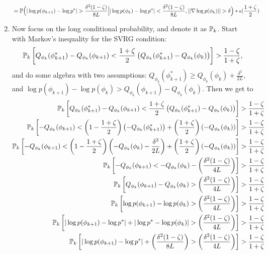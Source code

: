 \begin{enumerate}
\begin{align*}
        & = \mathbb{P}\Big(|\log p(\phi_{k+1}) - \log p^*| > \frac{\delta^2(1-\zeta)}{8L} \Big| |\log p(\phi_k) - \log p^*| < \frac{\delta^2(1-\zeta)}{8L}, ||\nabla \log p(\phi_k)|| > \delta \Big) * \epsilon(\frac{1+\zeta}{2})
    \end{align*}
    \item Now focus on the long conditional probability, and denote it as $\mathbb{P}_k$. Start with Markov's inequality for the SVRG condition:
    $$\mathbb{P}_k\left[Q_{\phi_k}(\phi^*_{k+1}) - Q_{\phi_k}(\phi_{k+1}) < \frac{1+\zeta}{2}\left(Q_{\phi_k}(\phi^*_{k+1}) - Q_{\phi_k}(\phi_{k})\right)\right] > \frac{1-\zeta}{1+\zeta},$$
    and do some algebra with two assumptions: $Q_{\phi_k}(\phi^*_{k+1}) \geq Q_{\phi_k}(\phi_k) + \frac{\delta^2}{2L}$, and $\log p(\phi_{k+1}) - \log p(\phi_{k}) > Q_{\phi_k}(\phi_{k+1}) - Q_{\phi_k}(\phi_{k})$. Then we get to
    \begin{align*}
        \bbP_k\left[Q_{\phi_k}(\phi^*_{k+1}) - Q_{\phi_k}(\phi_{k+1}) < \frac{1+\zeta}{2}\left(Q_{\phi_k}(\phi^*_{k+1}) - Q_{\phi_k}(\phi_{k})\right)\right] &> \frac{1-\zeta}{1+\zeta} \\
        \bbP_k\left[- Q_{\phi_k}(\phi_{k+1}) < \left(1-\frac{1+\zeta}{2}\right)\left(-Q_{\phi_k}(\phi^*_{k+1})\right) + \left(\frac{1+\zeta}{2}\right) \left(-Q_{\phi_{k}}(\phi_{k})\right)\right] &> \frac{1-\zeta}{1+\zeta} \\
        \bbP_k\left[-Q_{\phi_k}(\phi_{k+1}) < \left(1-\frac{1+\zeta}{2}\right)\left(-Q_{\phi_k}(\phi_{k}) - \frac{\delta^2}{2L}\right) + \left(\frac{1+\zeta}{2}\right) \left(-Q_{\phi_{k}}(\phi_{k})\right) \right] &> \frac{1-\zeta}{1+\zeta} \\
        \bbP_k\left[-Q_{\phi_k}(\phi_{k+1}) < -Q_{\phi_k}(\phi_{k}) - \left(\frac{\delta^2(1-\zeta)}{4L}\right) \right] &> \frac{1-\zeta}{1+\zeta} \\
        \bbP_k\left[Q_{\phi_k}(\phi_{k+1}) - Q_{\phi_k}(\phi_{k}) >  \left(\frac{\delta^2(1-\zeta)}{4L}\right) \right] &> \frac{1-\zeta}{1+\zeta} \\
        \bbP_k\left[\log p(\phi_{k+1}) - \log p(\phi_{k}) >  \left(\frac{\delta^2(1-\zeta)}{4L}\right) \right] &> \frac{1-\zeta}{1+\zeta} \\
        \bbP_k\left[|\log p(\phi_{k+1}) -\log p^*| + |\log p^* - \log p(\phi_{k})| >  \left(\frac{\delta^2(1-\zeta)}{4L}\right) \right] &> \frac{1-\zeta}{1+\zeta} \\
        \bbP_k\left[|\log p(\phi_{k+1}) -\log p^*| + \left(\frac{\delta^2(1-\zeta)}{8L}\right) >  \left(\frac{\delta^2(1-\zeta)}{4L}\right) \right] &> \frac{1-\zeta}{1+\zeta} \\

\end{align*}
\end{enumerate}
